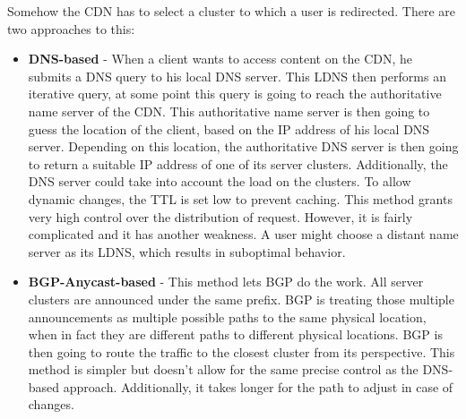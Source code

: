 Somehow the CDN has to select a cluster to which a user is redirected. There are two approaches to this:
\begin{itemize}
\item \textbf{DNS-based} - When a client wants to access content on the CDN, he submits a DNS query to his local DNS server. This LDNS then performs an iterative query, at some point this query is going to reach the authoritative name server of the CDN. This authoritative name server is then going to guess the location of the client, based on the IP address of his local DNS server. Depending on this location, the authoritative DNS server is then going to return a suitable IP address of one of its server clusters. Additionally, the DNS server could take into account the load on the clusters. To allow dynamic changes, the TTL is set low to prevent caching. This method grants very high control over the distribution of request. However, it is fairly complicated and it has another weakness. A user might choose a distant name server as its LDNS, which  results in suboptimal behavior.
\item \textbf{BGP-Anycast-based} - This method lets BGP do the work. All server clusters are announced under the same prefix. BGP is treating those multiple announcements as multiple possible paths to the same physical location, when in fact they are different paths to different physical locations. BGP is then going to route the traffic to the closest cluster from its perspective. This method is simpler but doesn't allow for the same precise control as the DNS-based approach. Additionally, it takes longer for the path to adjust in case of changes.
\end{itemize}

